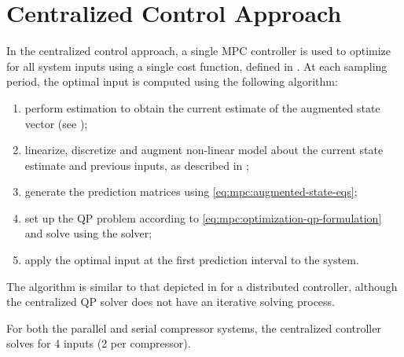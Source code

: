 \section{Centralized Control Approach}
\label{sec:mpc:centralized}

In the centralized control approach, a single MPC controller is used to optimize for all system inputs using a single cost function, defined in .
At each sampling period, the optimal input is computed using the following algorithm:

\begin{enumerate}
  \item perform estimation to obtain the current estimate of the augmented state vector (see );
  \item linearize, discretize and augment non-linear model about the current state estimate and previous inputs, as described in ;
  \item generate the prediction matrices using \eqref{eq:mpc:augmented-state-eqs};
  \item set up the QP problem according to \eqref{eq:mpc:optimization-qp-formulation} and solve using the \qpoases{} solver;
  \item apply the optimal input at the first prediction interval to the system.
\end{enumerate}

The algorithm is similar to that depicted in  for a distributed controller, although the centralized QP solver does not have an iterative solving process.

For both the parallel and serial compressor systems, the centralized controller solves for 4 inputs (2 per compressor). 


